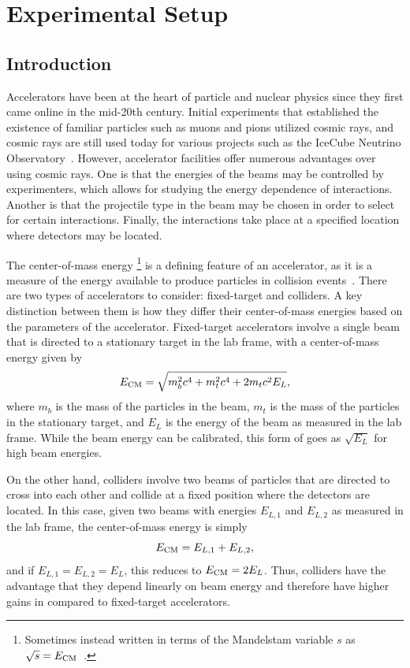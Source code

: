 
\chapter{Experimental Setup}
\label{chap:exp}

\section{Introduction}

Accelerators have been at the heart of particle and nuclear physics since they first came online in the mid-20th century.
Initial experiments that established the existence of familiar particles such as muons and pions utilized cosmic rays, and cosmic rays are still used today for various projects such as the IceCube Neutrino Observatory~\cite{Abbasi_2009}.
However, accelerator facilities offer numerous advantages over using cosmic rays.
One is that the energies of the beams may be controlled by experimenters, which allows for studying the energy dependence of interactions.
Another is that the projectile type in the beam may be chosen in order to select for certain interactions.
Finally, the interactions take place at a specified location where detectors may be located.

The center-of-mass energy \ECM\footnote{Sometimes instead written in terms of the Mandelstam variable $s$ as $\sqrt{s}=E_\mathrm{CM}$~\cite{Perelstein_2011}.} is a defining feature of an accelerator, as it is a measure of the energy available to produce particles in collision events~\cite{martin2008particle}.
There are two types of accelerators to consider: fixed-target and colliders. %
A key distinction between them is how they differ their center-of-mass energies based on the parameters of the accelerator.
Fixed-target accelerators involve a single beam that is directed to a stationary target in the lab frame, with a center-of-mass energy given by
\begin{equation}
  E_\mathrm{CM}=\sqrt{m_b^2c^4+m_t^2c^4+2m_tc^2E_L},
\end{equation}
where $m_b$ is the mass of the particles in the beam, $m_t$ is the mass of the particles in the stationary target, and $E_L$ is the energy of the beam as measured in the lab frame.
While the beam energy can be calibrated, this form of \ECM goes as $\sqrt{E_L}$ for high beam energies.

On the other hand, colliders involve two beams of particles that are directed to cross into each other and collide at a fixed position where the detectors are located.
In this case, given two beams with energies $E_{L,1}$ and $E_{L,2}$ as measured in the lab frame, the center-of-mass energy is simply
\begin{equation}
  E_\mathrm{CM}=E_{L,1}+E_{L,2},
\end{equation}
and if $E_{L,1}=E_{L,2}=E_L$, this reduces to $E_\mathrm{CM}=2E_L$.
Thus, colliders have the advantage that they depend linearly on beam energy and therefore have higher gains in \ECM compared to fixed-target accelerators.

